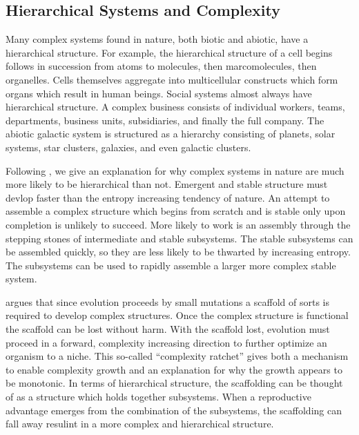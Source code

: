 \subsection{Hierarchical Systems and Complexity}

Many complex systems found in nature, both biotic and abiotic, have a
hierarchical structure. For example, the hierarchical structure of a cell
begins follows in succession from atoms to molecules, then marcomolecules, then
organelles. Cells themselves aggregate into multicellular constructs which form
organs which result in human beings. Social systems almost always have
hierarchical structure. A complex business consists of individual workers,
teams, departments, business units, subsidiaries, and finally the full company.
The abiotic galactic system is structured as a hierarchy consisting of
planets, solar systems, star clusters, galaxies, and even galactic clusters.

Following \citet{simon1991architecture}, we give an explanation for why complex
systems in nature are much more likely to be hierarchical than not. Emergent
and stable structure must devlop faster than the entropy increasing tendency of
nature. An attempt to assemble a complex structure which begins from scratch
and is stable only upon completion is unlikely to succeed. More likely to work
is an assembly through the stepping stones of intermediate and stable
subsystems. The stable subsystems can be assembled quickly, so they are less
likely to be thwarted by increasing entropy. The subsystems can be used to
rapidly assemble a larger more complex stable system.

\citet{cairns1995complexity} argues that since evolution proceeds by small
mutations a scaffold of sorts is required to develop complex structures. Once
the complex structure is functional the scaffold can be lost without harm. With
the scaffold lost, evolution must proceed in a forward, complexity increasing
direction to further optimize an organism to a niche. This so-called
``complexity ratchet'' gives both a mechanism to enable complexity growth and
an explanation for why the growth appears to be monotonic. In terms of
hierarchical structure, the scaffolding can be thought of as a structure which
holds together subsystems.  When a reproductive advantage emerges from the
combination of the subsystems, the scaffolding can fall away resulint in a more
complex and hierarchical structure.

